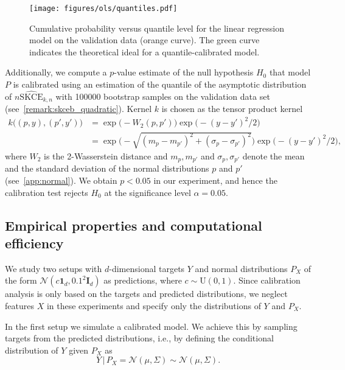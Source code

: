 \documentclass{article}
\begin{document}
\begin{figure}[hpt]
    \begin{center}
        \texttt{[image: figures/ols/quantiles.pdf]}
        \caption{Cumulative probability versus quantile level for the linear regression
        model on the validation data (orange curve). The green curve indicates the theoretical ideal
        for a quantile-calibrated model.}
        \label{fig:ols_quantiles}
    \end{center}
\end{figure}

Additionally, we compute a $p$-value estimate of the null hypothesis $H_0$ that model $P$
is calibrated using an estimation of the quantile of the asymptotic distribution
of $n \widehat{\mathrm{SKCE}}_{k,n}$ with 100000 bootstrap samples
on the validation data set (see~\cref{remark:skceb_quadratic}). Kernel $k$ is chosen
as the tensor product kernel
\begin{equation*}
    \begin{split}
        k\big((p, y), (p', y')\big) &= \exp{\big(-W_2(p, p')\big)} \exp{\big(-(y - y')^2/2 \big)} \\
        &= \exp{\bigg(-\sqrt{(m_p - m_{p'})^2 + (\sigma_p - \sigma_{p'})^2}\bigg)} \exp{\big(- (y - y')^2/2\big)},
    \end{split}
\end{equation*}
where $W_2$ is the 2-Wasserstein distance and $m_p, m_{p'}$ and $\sigma_p, \sigma_{p'}$ denote
the mean and the standard deviation of the normal distributions $p$ and $p'$ (see~\cref{app:normal}).
We obtain $p < 0.05$ in our experiment, and hence the calibration test rejects $H_0$ at the
significance level $\alpha = 0.05$.

\subsection{Empirical properties and computational efficiency}

We study two setups with $d$-dimensional targets $Y$ and normal distributions $P_X$
of the form $\mathcal{N}(c \mathbf{1}_d, 0.1^2 \mathbf{I}_d)$ as predictions,
where $c \sim \mathrm{U}(0, 1)$.
Since calibration analysis is only based on the targets and predicted distributions,
we neglect features $X$ in these experiments and specify only the distributions of
$Y$ and $P_X$.

In the first setup we simulate a calibrated model. We achieve this by sampling
targets from the predicted distributions, i.e., by defining the conditional
distribution of $Y$ given $P_X$ as
\begin{equation*}
    Y \,|\, P_X = \mathcal{N}(\mu, \Sigma) \sim \mathcal{N}(\mu, \Sigma).
\end{equation*}
\end{document}
